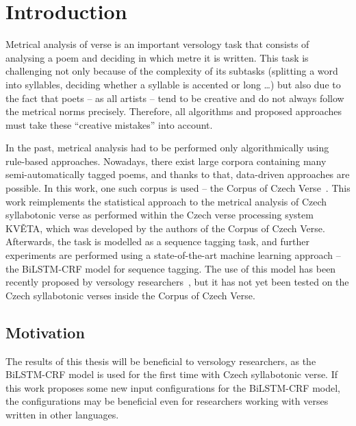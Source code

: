 \chapter*{Introduction}
\setcounter{page}{1}

Metrical analysis of verse is an important versology task that consists of analysing a poem and deciding in which metre it is written. This task is challenging not only because of the complexity of its subtasks (splitting a word into syllables, deciding whether a syllable is accented or long \ldots) but also due to the fact that poets -- as all artists -- tend to be creative and do not always follow the metrical norms precisely. Therefore, all algorithms and proposed approaches must take these \enquote{creative mistakes} into account.

In the past, metrical analysis had to be performed only algorithmically using rule-based approaches. Nowadays, there exist large corpora containing many semi-automatically tagged poems, and thanks to that, data-driven approaches are possible. In this work, one such corpus is used -- the Corpus of Czech Verse~\cite{CorpusCzechVerse}. This work reimplements the statistical approach to the metrical analysis of Czech syllabotonic verse as performed within the Czech verse processing system KVĚTA, which was developed by the authors of the Corpus of Czech Verse. Afterwards, the task is modelled as a sequence tagging task, and further experiments are performed using a state-of-the-art machine learning approach -- the BiLSTM-CRF model for sequence tagging. The use of this model has been recently proposed by versology researchers~\cite{ComparisonFeatureBasedNeualScansion}, but it has not yet been tested on the Czech syllabotonic verses inside the Corpus of Czech Verse.

\section*{Motivation}
The results of this thesis will be beneficial to versology researchers, as the BiLSTM-CRF model is used for the first time with Czech syllabotonic verse. If this work proposes some new input configurations for the BiLSTM-CRF model, the configurations may be beneficial even for researchers working with verses written in other languages.

